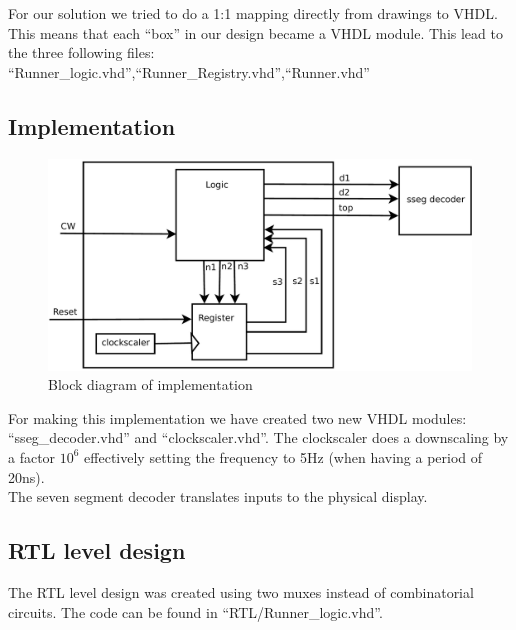 For our solution we tried to do a 1:1 mapping directly from drawings to VHDL. This means that each ``box'' in our design
became a VHDL module. This lead to the three following files: ``Runner_logic.vhd'',``Runner_Registry.vhd'',``Runner.vhd''


\subsection{Implementation}
\begin{figure}[!htbp] 
	\centering 
        \includegraphics[height=0.4\textwidth]{fig/Block_diagram_implementation.pdf}
	\caption{Block diagram of implementation}
	\label{fig:block_diagram} 
\end{figure}
For making this implementation we have created two new VHDL modules: ``sseg_decoder.vhd'' and ``clockscaler.vhd''. The clockscaler does a downscaling by a factor $10^{6}$ effectively setting the frequency to 5Hz (when having a period of 20ns).\\
The seven segment decoder translates inputs to the physical display.

\subsection{RTL level design}
The RTL level design was created using two muxes instead of combinatorial circuits. The code can be found in ``RTL/Runner_logic.vhd''.